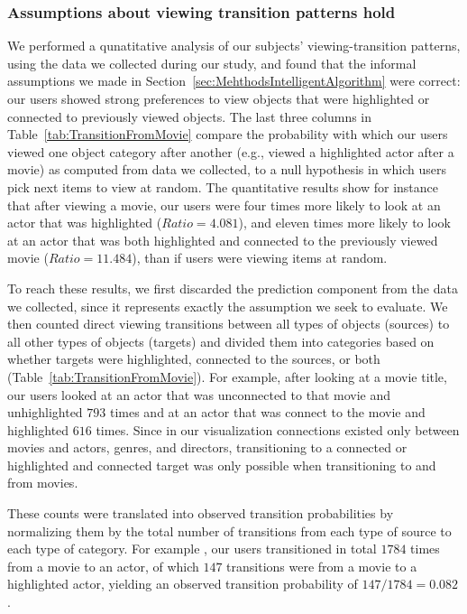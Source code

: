 \subsubsection{Assumptions about viewing transition patterns hold}
\label{sec:EvalAssumptionAboutViewingTransition}
We performed a qunatitative analysis of our subjects' viewing-transition patterns, using the data we collected during our study, and found that the informal assumptions we made in Section~\ref{sec:MehthodsIntelligentAlgorithm} were correct: our users showed strong preferences to view objects that were highlighted or connected to previously viewed objects. The last three columns in Table~\ref{tab:TransitionFromMovie} compare the probability with which our users viewed one object category after another (e.g., viewed a highlighted actor after a movie) as computed from data we collected, to a null hypothesis in which users pick next items to view at random. The quantitative results show for instance that after viewing a movie, our users were four times more likely to look at an actor that was highlighted ($Ratio = 4.081$), and eleven times more likely to look at an actor that was both highlighted and connected to the previously viewed movie ($Ratio = 11.484$), than if users were viewing items at random.  


To reach these results, we first discarded the prediction component from the data we collected, since it represents exactly the assumption we seek to evaluate. We then counted direct viewing transitions between all types of objects (sources) to all other types of objects (targets) and divided them into categories based on whether targets were highlighted, connected to the sources, or both (Table~\ref{tab:TransitionFromMovie}).  For example, after looking at a movie title, our users looked at an actor that was unconnected to that movie and unhighlighted $793$ times and at an actor that was connect to the movie and highlighted $616$ times. Since in our visualization connections existed only between movies and actors, genres, and directors, transitioning to a connected or highlighted and connected target was only possible when transitioning to and from movies.
    

These counts were translated into observed transition probabilities by normalizing them by the total number of transitions from each type of source to each type of category. For example , our users transitioned in total $1784$ times from a movie to an actor, of which $147$ transitions were from a movie to a highlighted actor, yielding an observed transition probability of $147 / 1784 = 0.082$.

